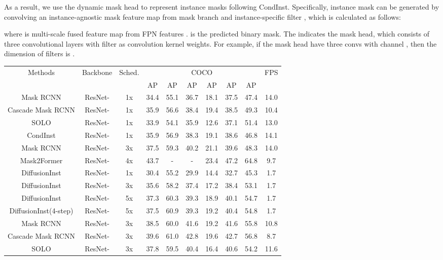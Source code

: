 \documentclass{article}
\begin{document}
As a result, we use the dynamic mask head to represent instance masks following CondInst\cite{CondInst}. Specifically, instance mask can be generated by convolving an instance-agnostic mask feature map  from mask branch and instance-specific filter , which is calculated as follows:

where  is multi-scale fused feature map from FPN features .  is the predicted binary mask. The  indicates the mask head, which consists of three  convolutional layers with filter  as convolution kernel weights. For example, if the mask head  have three convs with channel , then the dimension of filters  is .


\begin{table*}[thb]
\centering
\begin{tabular}{c|c|c|c|cc|ccc|c}
\toprule 
  \multirow{2}{*}{Methods}
  & \multirow{2}{*}{Backbone}
  & \multirow{2}{*}{Sched.}
  & \multicolumn{6}{c|}{COCO}
  & \multirow{2}{*}{FPS} \\
& &
  & AP 
  & AP 
  & AP 
  & AP 
  & AP
  & AP
  &\\
\midrule
  Mask RCNN &  ResNet- &1x &34.4 &55.1&   36.7 &   18.1&  37.5 &47.4& 14.0\\
  Cascade Mask RCNN &  ResNet- &1x & 35.9  &56.6 & 38.4  & 19.4 & 38.5 &49.3&10.4 \\
  SOLO &  ResNet- &1x &33.9  & 54.1   &35.9  &12.6   & 37.1   &51.4& 13.0 \\
CondInst &  ResNet- &1x &35.9  & 56.9&  38.3  &  19.1  & 38.6  & 46.8& 14.1\\
  Mask RCNN &  ResNet- &3x &37.5& 59.3& 40.2& 21.1& 39.6 &48.3 & 14.0\\
Mask2Former & ResNet- &4x &43.7  & - & - & 23.4 &47.2 &64.8  &9.7\\
DiffusionInst &  ResNet- &1x &30.4 &55.2 & 29.9  & 14.4  & 32.7 &45.3& 1.7\\
  DiffusionInst &  ResNet- &3x &35.6&58.2&37.4&17.2&38.4&53.1&1.7 \\
  DiffusionInst &  ResNet- &5x & 37.3&60.3&39.3&18.9&40.1&54.7& 1.7\\
  DiffusionInst(4-step) &  ResNet- &5x & 37.5&60.9&39.3&19.2&40.4&54.8&1.7  \\\midrule
  Mask RCNN &  ResNet- &3x & 38.5  & 60.0  & 41.6  & 19.2  & 41.6  & 55.8& 10.8\\
  Cascade Mask RCNN &  ResNet- &3x & 39.6 &  61.0  &42.8  &19.6    &42.7   &56.8&8.7  \\
  SOLO &  ResNet- &3x &37.8 &59.5  & 40.4  & 16.4   &40.6    & 54.2&11.6 \\

\end{tabular}
\end{table*}
\end{document}
